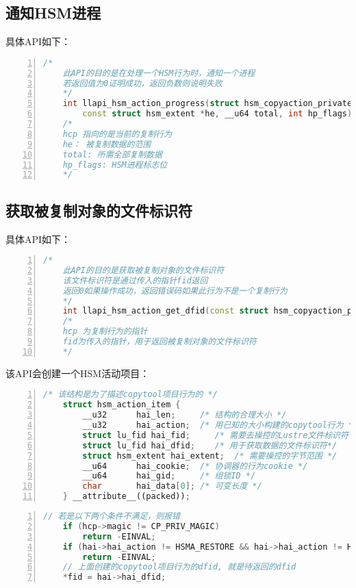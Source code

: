 \subsection{通知HSM进程}
具体API如下：
\begin{lstlisting}[language={c++},numbers=left]
    /* 
    此API的目的是在处理一个HSM行为时，通知一个进程
    若返回值为0证明成功，返回负数则说明失败 
    */
    int llapi_hsm_action_progress(struct hsm_copyaction_private *hcp,
        const struct hsm_extent *he, __u64 total, int hp_flags);
    /* 
    hcp 指向的是当前的复制行为
    he： 被复制数据的范围
    total: 所需全部复制数据
    hp_flags: HSM进程标志位
    */
\end{lstlisting}

\newpage
\subsection{获取被复制对象的文件标识符}
具体API如下：
\begin{lstlisting}[language={c++},numbers=left]
    /*
    此API的目的是获取被复制对象的文件标识符
    该文件标识符是通过传入的指针fid返回
    返回0如果操作成功，返回错误码如果此行为不是一个复制行为
    */
    int llapi_hsm_action_get_dfid(const struct hsm_copyaction_private *hcp, struct lu_fid *fid);
    /*
    hcp 为复制行为的指针
    fid为传入的指针，用于返回被复制对象的文件标识符
    */
\end{lstlisting}
该API会创建一个HSM活动项目：
\begin{lstlisting}[language={c++},numbers=left]
    /* 该结构是为了描述copytool项目行为的 */
    struct hsm_action_item {
        __u32      hai_len;     /* 结构的合理大小 */
        __u32      hai_action;  /* 用已知的大小构建的copytool行为 */
        struct lu_fid hai_fid;     /* 需要去操控的Lustre文件标识符 */
        struct lu_fid hai_dfid;    /* 用于获取数据的文件标识符*/
        struct hsm_extent hai_extent;  /* 需要操控的字节范围 */
        __u64      hai_cookie;  /* 协调器的行为cookie */
        __u64      hai_gid;     /* 组锁ID */
        char       hai_data[0]; /* 可变长度 */
    } __attribute__((packed));
\end{lstlisting}

\begin{lstlisting}[language={c++},numbers=left]
    // 若是以下两个条件不满足，则报错
    if (hcp->magic != CP_PRIV_MAGIC)
        return -EINVAL;
    if (hai->hai_action != HSMA_RESTORE && hai->hai_action != HSMA_ARCHIVE)
        return -EINVAL;
    // 上面创建的copytool项目行为的dfid, 就是待返回的dfid
    *fid = hai->hai_dfid;
\end{lstlisting}

